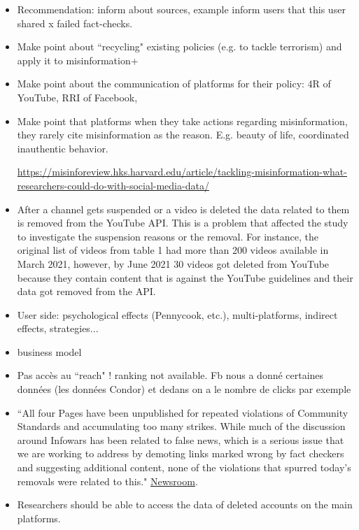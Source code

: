 \documentclass{article}
\begin{document}
{\begin{itemize}
	\item Recommendation: inform about sources, example inform users that this user shared x failed fact-checks. 

	\item Make point about ``recycling" existing policies (e.g. to tackle terrorism) and apply it to misinformation+

	\item Make point about the communication of platforms for their policy: 4R of YouTube, RRI of Facebook, 

	\item Make point that platforms when they take actions regarding misinformation, they rarely cite misinformation as the reason. E.g. beauty of life, coordinated inauthentic behavior. 

\href{https://misinforeview.hks.harvard.edu/article/tackling-misinformation-what-researchers-could-do-with-social-media-data/}{https://misinforeview.hks.harvard.edu/article/tackling-misinformation-what-researchers-could-do-with-social-media-data/}

	\item After a channel gets suspended or a video is deleted the data related to them is removed from the YouTube API. This is a problem that affected the study to investigate the suspension reasons or the removal. For instance, the original list of videos from table 1 had more than 200 videos available in March 2021, however, by June 2021 30 videos got deleted from YouTube because they contain content that is against the YouTube guidelines and their data got removed from the API. 
	
	\item User side: psychological effects (Pennycook, etc.), multi-platforms, indirect effects, strategies... 
	
	\item business model 
	
	\item Pas accès au ``reach" !  ranking not available. Fb nous a donné certaines données (les données Condor) et dedans on a le nombre de clicks par exemple
	
	\item ``All four Pages have been unpublished for repeated violations of Community Standards and accumulating too many strikes. While much of the discussion around Infowars has been related to false news, which is a serious issue that we are working to address by demoting links marked wrong by fact checkers and suggesting additional content, none of the violations that spurred today’s removals were related to this." \href{https://about.fb.com/news/2018/08/enforcing-our-community-standards/}{Newsroom}.
	\item Researchers should be able to access the data of deleted accounts on the main platforms.


\end{itemize}}
\end{document}
